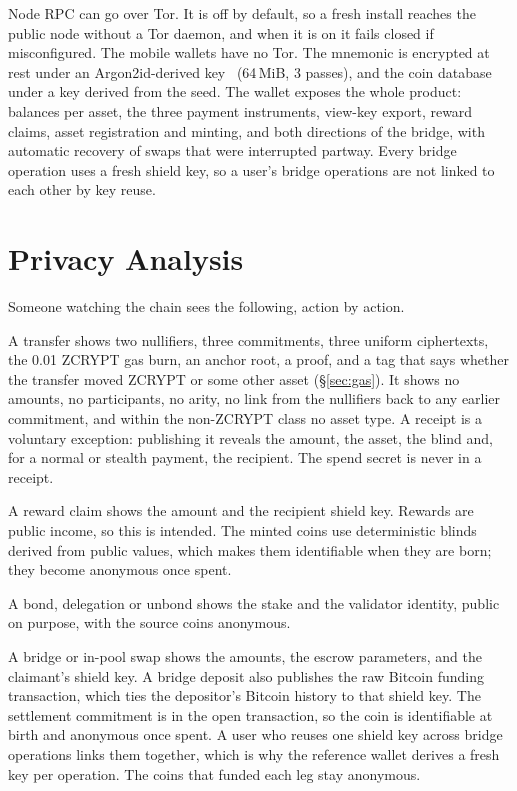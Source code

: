 \documentclass[twocolumn,10pt]{article}
\begin{document}
Node RPC can go over Tor. It is off by default, so a fresh install reaches the public node without a Tor daemon, and when it is on it fails closed if misconfigured. The mobile wallets have no Tor. The mnemonic is encrypted at rest under an Argon2id-derived key~\cite{argon2} (64\,MiB, 3 passes), and the coin database under a key derived from the seed. The wallet exposes the whole product: balances per asset, the three payment instruments, view-key export, reward claims, asset registration and minting, and both directions of the bridge, with automatic recovery of swaps that were interrupted partway. Every bridge operation uses a fresh shield key, so a user's bridge operations are not linked to each other by key reuse.

\section{Privacy Analysis}
\label{sec:privacy}

Someone watching the chain sees the following, action by action.

A transfer shows two nullifiers, three commitments, three uniform ciphertexts, the 0.01 ZCRYPT gas burn, an anchor root, a proof, and a tag that says whether the transfer moved ZCRYPT or some other asset (\S\ref{sec:gas}). It shows no amounts, no participants, no arity, no link from the nullifiers back to any earlier commitment, and within the non-ZCRYPT class no asset type. A receipt is a voluntary exception: publishing it reveals the amount, the asset, the blind and, for a normal or stealth payment, the recipient. The spend secret is never in a receipt.

A reward claim shows the amount and the recipient shield key. Rewards are public income, so this is intended. The minted coins use deterministic blinds derived from public values, which makes them identifiable when they are born; they become anonymous once spent.

A bond, delegation or unbond shows the stake and the validator identity, public on purpose, with the source coins anonymous.

A bridge or in-pool swap shows the amounts, the escrow parameters, and the claimant's shield key. A bridge deposit also publishes the raw Bitcoin funding transaction, which ties the depositor's Bitcoin history to that shield key. The settlement commitment is in the open transaction, so the coin is identifiable at birth and anonymous once spent. A user who reuses one shield key across bridge operations links them together, which is why the reference wallet derives a fresh key per operation. The coins that funded each leg stay anonymous.
\end{document}
